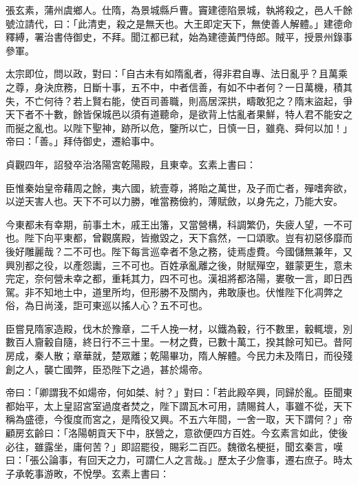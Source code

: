 \begin{pinyinscope}
 張玄素，蒲州虞鄉人。仕隋，為景城縣戶曹。竇建德陷景城，執將殺之，邑人千餘號泣請代，曰：「此清吏，殺之是無天也。大王即定天下，無使善人解體。」建德命釋縛，署治書侍御史，不拜。聞江都已弒，始為建德黃門侍郎。賊平，授景州錄事參軍。



 太宗即位，問以政，對曰：「自古未有如隋亂者，得非君自專、法日亂乎？且萬乘之尊，身決庶務，日斷十事，五不中，中者信善，有如不中者何？一日萬機，積其失，不亡何待？若上賢右能，使百司善職，則高居深拱，疇敢犯之？隋末盜起，爭天下者不十數，餘皆保城邑以須有道聽命，是欲背上怙亂者果鮮，特人君不能安之而挻之亂也。以陛下聖神，跡所以危，鑒所以亡，日慎一日，雖堯、舜何以加！」帝曰：「善。」拜侍御史，遷給事中。



 貞觀四年，詔發卒治洛陽宮乾陽殿，且東幸。玄素上書曰：



 臣惟秦始皇帝藉周之餘，夷六國，統壹尊，將貽之萬世，及子而亡者，殫嗜奔欲，以逆天害人也。天下不可以力勝，唯當務儉約，薄賦斂，以身先之，乃能大安。



 今東都未有幸期，前事土木，戚王出籓，又當營構，科調繁仍，失疲人望，一不可也。陛下向平東都，曾觀廣殿，皆撤毀之，天下翕然，一口頌歌。豈有初惡侈靡而後好雕麗哉？二不可也。陛下每言巡幸者不急之務，徒焉虛費。今國儲無兼年，又興別都之役，以產怨讟，三不可也。百姓承亂離之後，財賦殫空，雖蒙更生，意未完定，奈何營未幸之都，重耗其力，四不可也。漢祖將都洛陽，婁敬一言，即日西駕。非不知地土中，道里所均，但形勝不及關內，弗敢康也。伏惟陛下化凋弊之俗，為日尚淺，詎可東巡以搖人心？五不可也。



 臣嘗見隋家造殿，伐木於豫章，二千人挽一材，以鐵為轂，行不數里，轂輒壞，別數百人齎轂自隨，終日行不三十里。一材之費，已數十萬工，揆其餘可知已。昔阿房成，秦人散；章華就，楚眾離；乾陽畢功，隋人解體。今民力未及隋日，而役殘創之人，襲亡國弊，臣恐陛下之過，甚於煬帝。



 帝曰：「卿謂我不如煬帝，何如桀、紂？」對曰：「若此殿卒興，同歸於亂。臣聞東都始平，太上皇詔宮室過度者焚之，陛下謂瓦木可用，請賜貧人，事雖不從，天下稱為盛德，今復度而宮之，是隋役又興。不五六年間，一舍一取，天下謂何？」帝顧房玄齡曰：「洛陽朝貢天下中，朕營之，意欲便四方百姓。今玄素言如此，使後必往，雖露坐，庸何苦？」即詔罷役，賜彩二百匹。魏徵名梗挺，聞玄秦言，嘆曰：「張公論事，有回天之力，可謂仁人之言哉。」歷太子少詹事，遷右庶子。時太子承乾事游畋，不悅學。玄素上書曰：




\end{pinyinscope}
